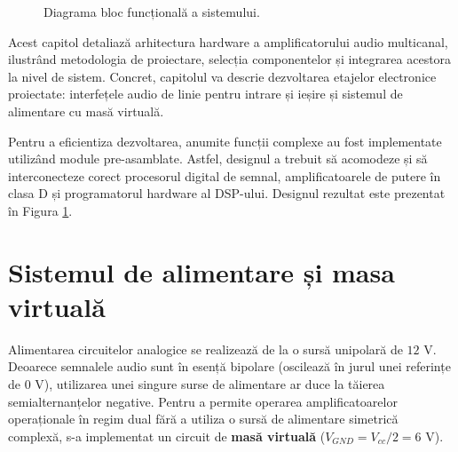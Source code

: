 \begin{figure}[htbp]
{
    }
    \caption{Diagrama bloc funcțională a sistemului.}
    \label{fig:block_diagram_sys}
\end{figure}

Acest capitol detaliază arhitectura hardware a amplificatorului audio multicanal, ilustrând metodologia de proiectare, selecția componentelor și integrarea acestora la nivel de sistem. Concret, capitolul va descrie dezvoltarea etajelor electronice proiectate: interfețele audio de linie pentru intrare și ieșire și sistemul de alimentare cu masă virtuală. 

Pentru a eficientiza dezvoltarea, anumite funcții complexe au fost implementate utilizând module pre-asamblate. Astfel, designul a trebuit să acomodeze și să interconecteze corect procesorul digital de semnal, amplificatoarele de putere în clasa D și programatorul hardware al DSP-ului. Designul rezultat este prezentat în Figura \ref{fig:block_diagram_sys}.

\section{Sistemul de alimentare și masa virtuală}
Alimentarea circuitelor analogice se realizează de la o sursă unipolară de $12\text{ V}$. Deoarece semnalele audio sunt în esență bipolare (oscilează în jurul unei referințe de $0\text{ V}$), utilizarea unei singure surse de alimentare ar duce la tăierea semialternanțelor negative. Pentru a permite operarea amplificatoarelor operaționale în regim dual fără a utiliza o sursă de alimentare simetrică complexă, s-a implementat un circuit de \textbf{masă virtuală} ($V_{GND} = V_{cc}/2 = 6\text{ V}$).

